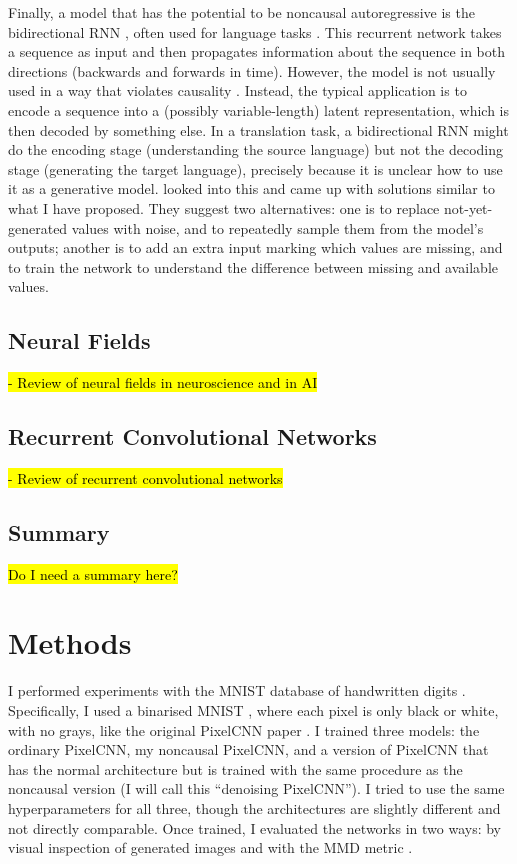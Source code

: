 \documentclass[11pt, a4paper, openany]{book}
\newcommand{\nquote}[1]{``{#1}''}
\begin{document}
Finally, a model that has the potential to be noncausal autoregressive is the bidirectional RNN \citep{brnn1,brnn2}, often used for language tasks \citep{brnnuse1,brnnuse2,brnnuse3}. This recurrent network takes a sequence as input and then propagates information about the sequence in both directions (backwards and forwards in time). However, the model is not usually used in a way that violates causality \citep{brnndenoise}. Instead, the typical application is to encode a sequence into a (possibly variable-length) latent representation, which is then decoded by something else. In a translation task, a bidirectional RNN might do the encoding stage (understanding the source language) but not the decoding stage (generating the target language), precisely because it is unclear how to use it as a generative model. \citet{brnndenoise} looked into this and came up with solutions similar to what I have proposed. They suggest two alternatives: one is to replace not-yet-generated values with noise, and to repeatedly sample them from the model's outputs; another is to add an extra input marking which values are missing, and to train the network to understand the difference between missing and available values.

\section{Neural Fields}

\hl{- Review of neural fields in neuroscience and in AI}

\section{Recurrent Convolutional Networks}

\hl{- Review of recurrent convolutional networks}
\citet{videopixel}

\section{Summary}
\hl{Do I need a summary here?}

\chapter{Methods}
\label{cha:methods}

I performed experiments with the MNIST database of handwritten digits \citep{mnist}. Specifically, I used a binarised MNIST \citep{binarisedmnist}, where each pixel is only black or white, with no grays, like the original PixelCNN paper \citep{pixelcnn1}. I trained three models: the ordinary PixelCNN, my noncausal PixelCNN, and a version of PixelCNN that has the normal architecture but is trained with the same procedure as the noncausal version (I will call this \nquote{denoising PixelCNN}). I tried to use the same hyperparameters for all three, though the architectures are slightly different and not directly comparable. Once trained, I evaluated the networks in two ways: by visual inspection of generated images and with the MMD metric \citep{mmd,ganmetrics}.
\end{document}
